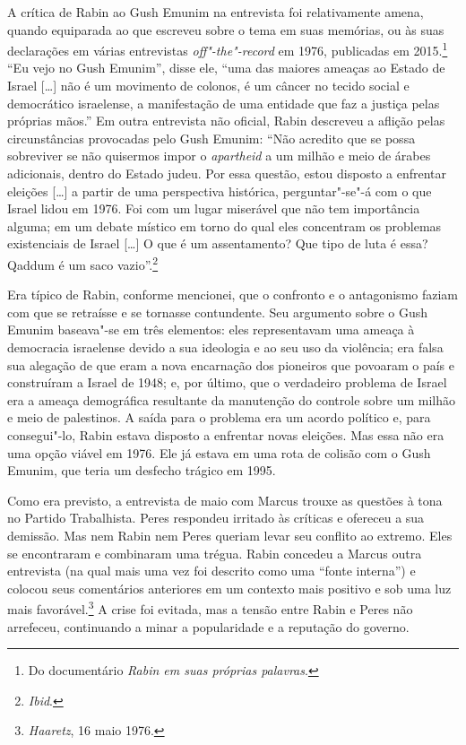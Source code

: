 A crítica de Rabin ao Gush Emunim na entrevista foi relativamente amena,
quando equiparada ao que escreveu sobre o tema em suas memórias, ou às
suas declarações em várias entrevistas \emph{off"-the"-record} em 1976, 
publicadas em 2015.\footnote{Do documentário \emph{Rabin em suas próprias palavras}.} ``Eu vejo no Gush Emunim'', disse
ele, ``uma das maiores ameaças ao Estado de Israel {[}\ldots{}{]} não é um movimento
de colonos, é um câncer no tecido social e democrático israelense, a
manifestação de uma entidade que faz a justiça pelas próprias mãos.'' Em
outra entrevista não oficial, Rabin descreveu a aflição pelas
circunstâncias provocadas pelo Gush Emunim: ``Não acredito que se possa
sobreviver se não quisermos impor o \emph{apartheid} a um milhão e meio
de árabes adicionais, dentro do Estado judeu. Por essa questão, estou
disposto a enfrentar eleições {[}\ldots{}{]} a partir de uma perspectiva histórica,
perguntar"-se"-á com o que Israel lidou em 1976. Foi com um lugar
miserável que não tem importância alguma; em um debate místico em torno
do qual eles concentram os problemas existenciais de Israel {[}\ldots{}{]} O que é um
assentamento? Que tipo de luta é essa? Qaddum é um saco
vazio''.\footnote{\emph{Ibid}.}

Era típico de Rabin, conforme mencionei, que o confronto e o antagonismo
faziam com que se retraísse e se tornasse contundente. Seu argumento
sobre o Gush Emunim baseava"-se em três elementos: eles representavam
uma ameaça à democracia israelense devido a sua ideologia e ao seu uso
da violência; era falsa sua alegação de que eram a nova encarnação
dos pioneiros que povoaram o país e construíram a Israel de 1948; e, por
último, que o verdadeiro problema de Israel era a ameaça demográfica
resultante da manutenção do controle sobre um milhão e meio de
palestinos. A saída para o problema era um acordo político e, para
consegui"-lo, Rabin estava disposto a enfrentar novas eleições. Mas essa
não era uma opção viável em 1976. Ele já estava em uma rota de colisão
com o Gush Emunim, que teria um desfecho trágico em 1995.

Como era previsto, a entrevista de maio com Marcus trouxe as
questões à tona no Partido Trabalhista. Peres respondeu irritado às
críticas e ofereceu a sua demissão. Mas nem Rabin nem Peres queriam
levar seu conflito ao extremo. Eles se encontraram e combinaram uma
trégua. Rabin concedeu a Marcus outra entrevista (na qual mais uma vez
foi descrito como uma ``fonte interna'') e colocou seus comentários
anteriores em um contexto mais positivo e sob uma luz mais
favorável.\footnote{\emph{Haaretz}, 16 maio 1976.} A crise foi evitada, mas a tensão entre Rabin e
Peres não arrefeceu, continuando a minar a popularidade e a reputação do
governo.

